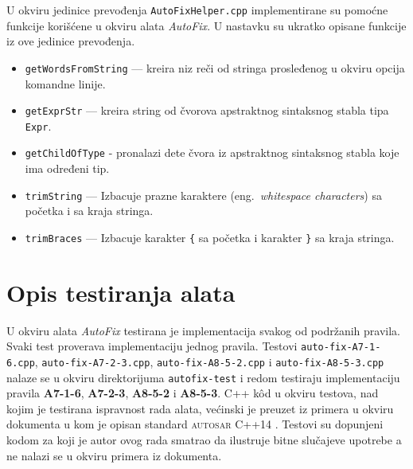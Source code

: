 \documentclass[12pt,oneside]{memoir}
\begin{document}
U okviru jedinice prevođenja \texttt{AutoFixHelper.cpp} implementirane su pomo\'{c}ne funkcije kori\v{s}\'{c}ene u okviru alata \textit{AutoFix}. U nastavku su ukratko opisane funkcije iz ove jedinice prevođenja.
\begin{itemize}
  \item \texttt{getWordsFromString} --- kreira niz re\v{c}i od stringa prosleđenog u okviru opcija komandne linije.
  \item \texttt{getExprStr} --- kreira string od \v{c}vorova apstraktnog sintaksnog stabla tipa \texttt{Expr}.
  \item \texttt{getChildOfType} - pronalazi dete \v{c}vora iz apstraktnog sintaksnog stabla koje ima određeni tip.
  \item \texttt{trimString} --- Izbacuje prazne karaktere (eng.~\textit{whitespace characters}) sa po\v{c}etka i sa kraja stringa.
  \item \texttt{trimBraces} --- Izbacuje karakter \texttt{\{} sa po\v{c}etka i karakter \texttt{\}} sa kraja stringa.
\end{itemize}

\section{Opis testiranja alata}

U okviru alata \textit{AutoFix} testirana je implementacija svakog od podr\v{z}anih pravila. Svaki test proverava implementaciju jednog pravila.
Testovi \texttt{auto-fix-A7-1-6\-.cpp}, \texttt{auto-fix-A7-2-3.cpp}, \texttt{auto-fix-A8-5-2.cpp} i \texttt{auto-fix-A8-5-3.cpp} nalaze se u okviru direktorijuma \texttt{autofix-test} i redom testiraju implementaciju pravila
\textbf{A7-1-6}, \textbf{A7-2-3}, \textbf{A8-5-2} i \textbf{A8-5-3}. C++ k\^{o}d u okviru testova, nad kojim je testirana ispravnost rada alata, ve\'c{i}nski je preuzet iz primera u okviru dokumenta u kom je opisan standard \textsc{autosar} C++14 \cite{AutosarGuidelines}. Testovi su dopunjeni kodom za koji je autor ovog rada smatrao da ilustruje bitne  slu\v{c}ajeve upotrebe a ne nalazi se u okviru primera iz dokumenta.
\end{document}
